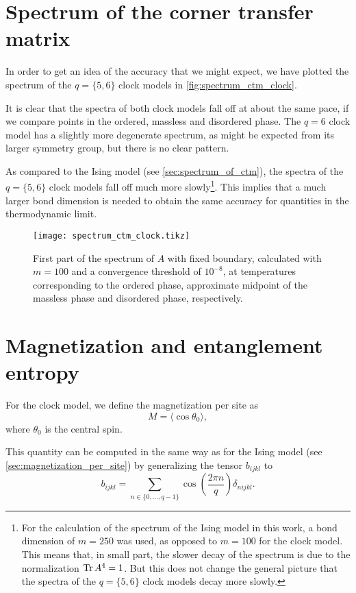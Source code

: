 \section{Spectrum of the corner transfer matrix}

In order to get an idea of the accuracy that we might expect, we have plotted the spectrum of the $q = \{5,
6\}$ clock models in \autoref{fig:spectrum_ctm_clock}.

It is clear that the spectra of both clock models fall off at about the same pace,
if we compare points in the ordered, massless and disordered phase.
The $q = 6$ clock model has a slightly more degenerate spectrum, as might be expected from its larger symmetry group,
but there is no clear pattern.

As compared to the Ising model (see \autoref{sec:spectrum_of_ctm}), the spectra of the $q = \{5,
6\}$ clock models fall off much more slowly\footnote{For the calculation of the spectrum of the Ising model in this
work, a bond dimension of $m = 250$ was used, as opposed to $m = 100$ for the clock model.
This means that, in small part, the slower decay of the spectrum is due to the normalization $\operatorname{Tr} A^4 = 1$.
But this does not change the general picture that the spectra of the $q = \{5,
6\}$ clock models decay more slowly.}.
This implies that a much larger bond dimension is needed to obtain the same accuracy for quantities in the thermodynamic
limit.

\begin{figure}
  \texttt{[image: spectrum\_ctm\_clock.tikz]}
  \caption{First part of the spectrum of $A$ with fixed boundary,
  calculated with $m = 100$ and a convergence threshold of $10^{-8}$,
  at temperatures corresponding to the ordered phase, approximate midpoint of the massless phase and disordered phase,
  respectively.}\label{fig:spectrum_ctm_clock}
\end{figure}

\section{Magnetization and entanglement entropy}

For the clock model, we define the magnetization per site as
\begin{equation}\label{eq:magnetization_clock_model}
  M = \langle \cos \theta_0 \rangle,
\end{equation}
where $\theta_0$ is the central spin.

This quantity can be computed in the same way as for the Ising model (see \autoref{sec:magnetization_per_site}) by
generalizing the tensor $b_{i j k l}$ to
\begin{equation}
  b_{i j k l} = \sum_{n \in \{ 0, \dots, q-1 \}} \cos \left( \frac{2\pi n}{q} \right) \delta_{n i j k l}.
\end{equation}

